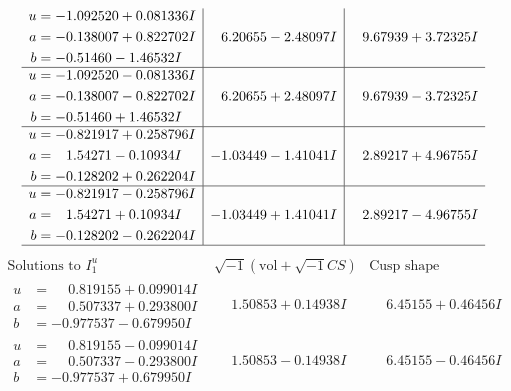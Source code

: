 \documentclass[1p]{elsarticle_modified}
\theoremstyle{definition}
\newcommand{\I}{\sqrt{-1}}
\begin{document}
$$\begin{array}{c|c|c}
\begin{aligned}
u &= -1.092520 + 0.081336 I \\
a &= -0.138007 + 0.822702 I \\
b &= -0.51460 - 1.46532 I\end{aligned}
 & \phantom{-}6.20655 - 2.48097 I & \phantom{-}9.67939 + 3.72325 I \\ \hline\begin{aligned}
u &= -1.092520 - 0.081336 I \\
a &= -0.138007 - 0.822702 I \\
b &= -0.51460 + 1.46532 I\end{aligned}
 & \phantom{-}6.20655 + 2.48097 I & \phantom{-}9.67939 - 3.72325 I \\ \hline\begin{aligned}
u &= -0.821917 + 0.258796 I \\
a &= \phantom{-}1.54271 - 0.10934 I \\
b &= -0.128202 + 0.262204 I\end{aligned}
 & -1.03449 - 1.41041 I & \phantom{-}2.89217 + 4.96755 I \\ \hline\begin{aligned}
u &= -0.821917 - 0.258796 I \\
a &= \phantom{-}1.54271 + 0.10934 I \\
b &= -0.128202 - 0.262204 I\end{aligned}
 & -1.03449 + 1.41041 I & \phantom{-}2.89217 - 4.96755 I\\
 \hline 
 \end{array}$$\newpage$$\begin{array}{c|c|c}  
\text{Solutions to }I^u_{1}& \I (\text{vol} + \sqrt{-1}CS) & \text{Cusp shape}\\
 \hline 
\begin{aligned}
u &= \phantom{-}0.819155 + 0.099014 I \\
a &= \phantom{-}0.507337 + 0.293800 I \\
b &= -0.977537 - 0.679950 I\end{aligned}
 & \phantom{-}1.50853 + 0.14938 I & \phantom{-}6.45155 + 0.46456 I \\ \hline\begin{aligned}
u &= \phantom{-}0.819155 - 0.099014 I \\
a &= \phantom{-}0.507337 - 0.293800 I \\
b &= -0.977537 + 0.679950 I\end{aligned}
 & \phantom{-}1.50853 - 0.14938 I & \phantom{-}6.45155 - 0.46456 I \\ \hline\begin{aligned}

\end{aligned}
\end{array}$$
\end{document}
